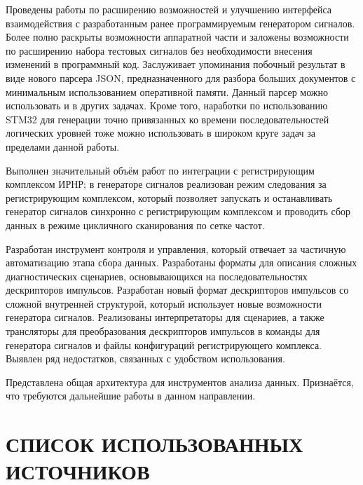 \documentclass{report}
\begin{document}
Проведены работы по расширению возможностей и улучшению интерфейса взаимодействия с разработанным ранее программируемым генератором сигналов. Более полно раскрыты возможности аппаратной части и заложены возможности по расширению набора тестовых сигналов без необходимости внесения изменений в программный код. Заслуживает упоминания побочный результат в виде нового парсера JSON, предназначенного для разбора больших документов с минимальным использованием оперативной памяти. Данный парсер можно использовать и в других задачах. Кроме того, наработки по использованию STM32 для генерации точно привязанных ко времени последовательностей логических уровней тоже можно использовать в широком круге задач за пределами данной работы.

Выполнен значительный объём работ по интеграции с регистрирующим комплексом ИРНР; в генераторе сигналов реализован режим следования за регистрирующим комплексом, который позволяет запускать и останавливать генератор сигналов синхронно с регистрирующим комплексом и проводить сбор данных в режиме цикличного сканирования по сетке частот.

Разработан инструмент контроля и управления, который отвечает за частичную автоматизацию этапа сбора данных. Разработаны форматы для описания сложных диагностических сценариев, основывающихся на последовательностях дескрипторов импульсов. Разработан новый формат дескрипторов импульсов со сложной внутренней структурой, который использует новые возможности генератора сигналов. Реализованы интерпретаторы для сценариев, а также трансляторы для преобразования дескрипторов импульсов в команды для генератора сигналов и файлы конфигураций регистрирующего комплекса. Выявлен ряд недостатков, связанных с удобством использования.

Представлена общая архитектура для инструментов анализа данных. Признаётся, что требуются дальнейшие работы в данном направлении.

\chapter*{СПИСОК ИСПОЛЬЗОВАННЫХ ИСТОЧНИКОВ}
\end{document}
